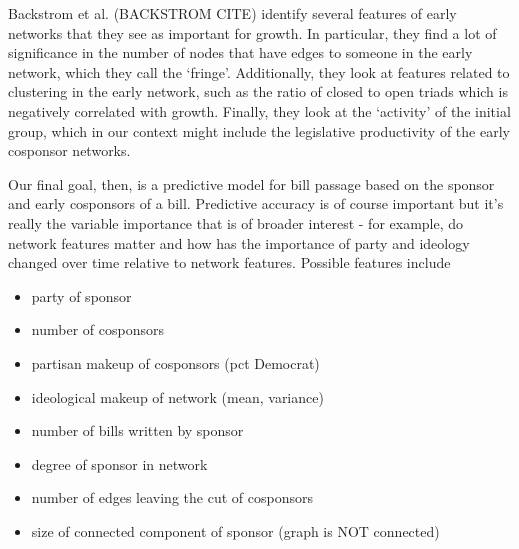 Backstrom et al. (BACKSTROM CITE) identify several features of early networks
that they see as important for growth. In particular, they find a lot of
significance in the number of nodes that have edges to someone in the early
network, which they call the `fringe'. Additionally, they look at features
related to clustering in the early network, such as the ratio of closed to open
triads which is negatively correlated with growth. Finally, they look at the
`activity' of the initial group, which in our context might include the
legislative productivity of the early cosponsor networks.

Our final goal, then, is a predictive model for bill passage based on the
sponsor and early cosponsors of a bill. Predictive accuracy is of course
important but it's really the variable importance that is of broader interest -
for example, do network features matter and how has the importance of party and
ideology changed over time relative to network features. Possible features
include

\begin{itemize}
	\item party of sponsor
	\item number of cosponsors
	\item partisan makeup of cosponsors (pct Democrat)
	\item ideological makeup of network (mean, variance)
	\item number of bills written by sponsor
	\item degree of sponsor in network
	\item number of edges leaving the cut of cosponsors
	\item size of connected component of sponsor (graph is NOT connected)
\end{itemize}